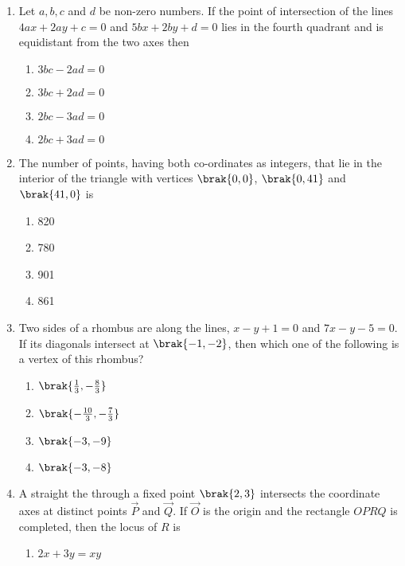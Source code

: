 \begin{enumerate}
\item Let $a, b, c$ and $d$ be non-zero numbers. If the point of intersection of the lines $4ax+2ay+c=0$ and $5bx+2by+d=0$ lies in the fourth quadrant and is equidistant from the two axes then \hfill {}
\begin{multicols}{2}
\begin{enumerate}
\item $3bc-2ad= 0$
\item $3bc+2ad=0$
\item $2bc-3ad= 0$
\item $2bc+3ad=0$ 
\end{enumerate}
\end{multicols}
%
\item The number of points, having both co-ordinates as integers, 
that lie in the interior of the triangle with vertices $\brak{0, 0}$,  $\brak{0,41}$ and $\brak{41, 0}$ is 
\hfill {}
\begin{multicols}{4}
\begin{enumerate}
\item 820
\item 780
\item 901
\item 861
\end{enumerate}
\end{multicols}
%
\item Two sides of a rhombus are along the lines, $x-y+1=0$ and 
$7x-y-5=0$. If its diagonals intersect at $\brak{-1, -2}$, then which one of the following is a vertex of this rhombus?
%
\hfill{}
\begin{multicols}{4}
\begin{enumerate}
\item $\brak{\frac{1}{3}, -\frac{8}{3}}$
\item $\brak{-\frac{10}{3}, -\frac{7}{3}}$
\item $\brak{-3, -9}$
\item $\brak{-3, -8}$
\end{enumerate}
\end{multicols}
%
\item A straight the through a fixed point $\brak{2, 3}$ intersects the 
	coordinate axes at distinct points $\vec{P}$ and $\vec{Q}$. If $\vec{O}$ is the origin 
and the rectangle $OPRQ$ is completed, then the locus of $R$ is
%
\hfill {}
\begin{multicols}{2}
\begin{enumerate}
\item $2x+3y = xy$

\end{enumerate}
\end{multicols}
\end{enumerate}
